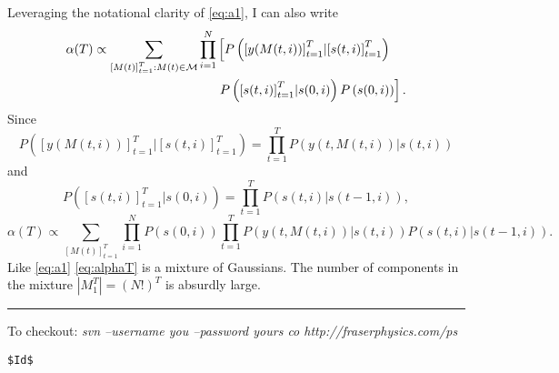 \documentclass[12pt]{article}
\newcommand{\M}{{\cal M}}
\newcommand{\os}[4]{{\left[ #1(#2) \right]}_{#3}^{#4}} %
\newcommand{\ti}[2]{{#1}{(#2)}}                         %
\newcommand{\ts}[4]{{#1}_{#3}^{#4}} %
\begin{document}
Leveraging the notational clarity of \eqref{eq:a1}, I can also write
\begin{align*}
  \ti{\alpha}{T} \propto \sum_{\os{M}{t}{t=1}{T}:\ti{M}{t}\in \M}
  \prod_{i=1}^N& \left[
  P\left( \os{y}{\ti{M}{t,i}}{t=1}{T} | \os{s}{t,i}{t=1}{T}\right) \right. \\
  & \left. P\left( \os{s}{t,i}{t=1}{T}| \ti{s}{0,i} \right)
  P\left( \ti{s}{0,i} \right) \right] .
\end{align*}
Since
\begin{equation*}
  P\left( \os{y}{\ti{M}{t,i}}{t=1}{T} | \os{s}{t,i}{t=1}{T}\right) =
  \prod_{t=1}^T P\left( \ti{y}{t,\ti{M}{t,i}} | \ti{s}{t,i}\right)
\end{equation*}
and
\begin{equation*}
  P\left( \os{s}{t,i}{t=1}{T}| \ti{s}{0,i} \right) = \prod_{t=1}^T
  P\left( \ti{s}{t,i} | \ti{s}{t-1,i}\right),
\end{equation*}
\begin{equation}
  \label{eq:alphaT}
  \ti{\alpha}{T} \propto \sum_{\os{M}{t}{t=1}{T}}
  \prod_{i=1}^N  P\left( \ti{s}{0,i} \right) \prod_{t=1}^T
  P\left( \ti{y}{t,\ti{M}{t,i}} | \ti{s}{t,i}\right)
  P\left( \ti{s}{t,i} | \ti{s}{t-1,i}\right).
\end{equation}
Like \eqref{eq:a1} \eqref{eq:alphaT} is a mixture of Gaussians.  The
number of components in the mixture $\left| \ts{M}{t}{1}{T}\right| =
(N!)^T$ is absurdly large.

\vfill \hrule To checkout: \emph{ svn --username you --password yours
  co http://fraserphysics.com/ps}
\begin{verbatim}
$Id$
\end{verbatim}
\end{document}
